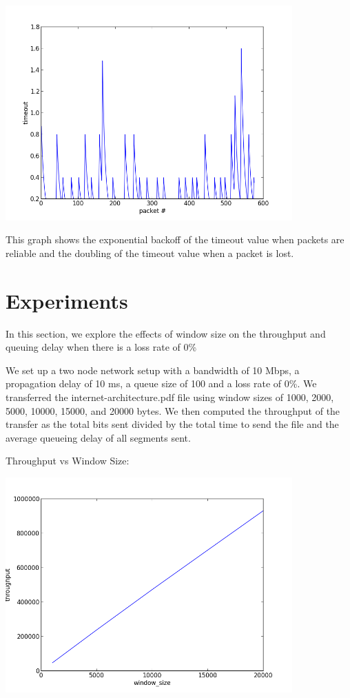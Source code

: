 \documentclass[11pt]{article}
\begin{document}
\includegraphics[width=11cm]{timeout.png}

This graph shows the exponential backoff of the timeout value when packets are reliable and the doubling of the timeout value when a packet is lost. 

\section{Experiments}
In this section, we explore the effects of window size on the throughput and queuing delay when there is a loss rate of 0\%

We set up a two node network setup with a bandwidth of 10 Mbps, a propagation delay of 10 ms, a queue size of 100 and a loss rate of 0\%. We transferred the internet-architecture.pdf file using window sizes of 1000, 2000, 5000, 10000, 15000, and 20000 bytes. We then computed the throughput of the transfer as the total bits sent divided by the total time to send the file and the average queueing delay of all segments sent. 



Throughput vs Window Size:

\includegraphics[width=11cm]{throughput.png}
\end{document}
